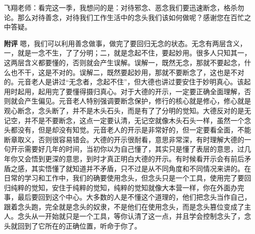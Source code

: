 \begin{case}
    飞翔老师：看完这一季，我想问的是：对待邪念、恶念我们要迅速断念，格杀勿论。那么对待善念，对待我们工作生活中的念头我们该如何做呢？感谢您在百忙之中答疑。

    \textbf{附评} 嗯，我们可以利用善念做事，做完了要回归无念的状态。无念有两层含义，一，就是一念不生，了了分明；二，就是念起不住，要起妙用。很多人只知其一，这两层含义都要懂的，否则就会产生误解。误解一，既然无念，那就不要起念，什么也不干，这是不对的。误解二，既然要起妙用，那就不要断念了，这也是不对的。元音老人是讲过“无念者，念起不住”，但大德也讲过要安住于妙明真心。该起用时起用，起用完了要懂得摄归真心。对于大德的开示，一定要正确全面理解，否则就会产生偏见。元音老人特别强调要断念保护，修行的核心就是修心，修心就是观心断念，念头断了，并不是木头石头，而是有了了分明的觉知。大德反对的是无记空，并不是不要断念，这点一定要认清，无记空就像木头石头一样，虽然一个念头都没有，但是却没有知觉。元音老人的开示是非常好的，但一定要看全面，不能断章取义，否则很容易错会。大德的开示很耐看，意思非常深，有时理解大德的一句开示需要好几年的时间，当初你以为自己懂了，其实只是懂了表层的意思，过几年你又会悟到更深的意思，到时才真正明白大德的开示。有时候看开示会有前后矛盾之感，其实悟懂了就知道并不矛盾，只不过是从不同角度和不同情况来讲的。在日常的学习和工作中，我们的确要使用念头，但念头只是一个工具，使用完了要回归纯粹的觉知，安住于纯粹的觉知，纯粹的觉知就像大本营一样，你在外面办完事，最后要回到这个中心。大多数的人是不懂这个道理的，他们把念头当作自己，跟着念头跑，完全就是念头的奴隶，不是他们在使用念头，而是念头篡位变成了主人。念头从一开始就只是一个工具，等你认清了这一点，并且学会控制念头了，念头就回到了它所在的正确位置，听命于你了。
\end{case}

